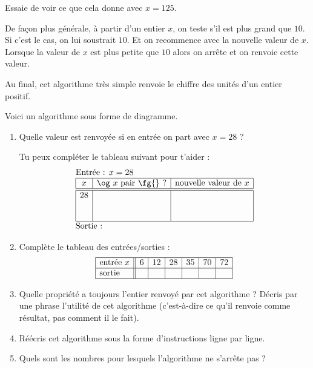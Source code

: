 \documentclass[class=report,crop=false, 12pt]{standalone}
\begin{document}
Essaie de voir ce que cela donne avec $x=125$.

De façon plus générale, à partir d'un entier $x$, on teste s'il est plus grand que $10$. Si c'est le cas, on lui soustrait $10$. Et on recommence avec la nouvelle valeur de $x$. Lorsque la valeur de $x$ est plus petite que $10$ alors on arrête et on renvoie cette valeur. 

Au final, cet algorithme très simple renvoie le chiffre des unités d'un entier positif.

\bigskip
\bigskip


\begin{activite}
Voici un algorithme sous forme de diagramme.


\begin{enumerate}
    \item Quelle valeur est renvoyée si en entrée on part avec $x = 28$ ?
    
    Tu peux compléter le tableau suivant pour t'aider :
  $$
  \begin{array}{l}
  \text{Entrée : $x=28$}    \\
  \begin{array}{|c|c|c|}
  \hline  
   x & \text{\og $x$ pair \fg{} ?} & \text{nouvelle valeur de } x \\
  \hline\hline 
  28 &  &  \\
   &  &  \\
   &  &  \\
  \hline
  \end{array} \\
  \text{Sortie : }  
  \end{array} 
  $$ 
    
    
    
    
    
    \item Complète le tableau des entrées/sorties : 
        $$\begin{array}{|l||c|c|c|c|c|c|c|c|}
  \hline
  \text{entrée } x & 6&12&28&35&70&72\\
  \hline
  \text{sortie } & &&&&& \\
  \hline
  \end{array}  
  $$ 
    \item Quelle propriété a toujours l'entier renvoyé par cet algorithme ? Décris par une phrase l'utilité de cet algorithme (c'est-à-dire ce qu'il renvoie comme résultat, pas comment il le fait).
    
    
    \item Réécris cet algorithme sous la forme d'instructions ligne par ligne.

    \item Quels sont les nombres pour lesquels l'algorithme ne s'arrête pas ?
\end{enumerate}

\end{activite}
\end{document}
